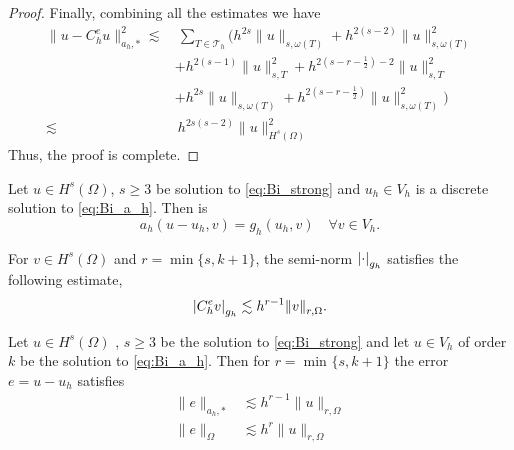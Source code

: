 \begin{proof}
    Finally, combining all the estimates we have
    \[
        \begin{split}
            \| u - C_{h}^{e}u \|_{ a_{h}, * }^{  2}  \lesssim  & \   \sum_{T \in \mathcal{T}_h}^{}  \bigg(    h^{2s}\| u \|_{s, \omega ( T)   }^{  } +  h^{2(s-2)} \| u \|_{ s, \omega ( T)  }^{ 2 } \\
             & +  h^{2(s-1)} \| u \|_{s,T }^{ 2} + h^{2(s- r- \frac{1}{2}) -2}   \| u \|_{s,T  }^{  2} \\
            & + h^{2s}  \| u \|_{s, \omega ( T)   }^{  } + h^{2(s-r -\frac{1}{2})}  \| u \|_{ s, \omega ( T)  }^{2  } \bigg) \\
            \lesssim & \ h^{2s ( s-2) } \| u \|_{H^{s}( \Omega )   }^{2  }
        \end{split}
    \]
    Thus, the proof is complete.
\end{proof}

\begin{lemma}
Let $u \in H^{s}( \Omega )  $, $ s\ge 3 $  be solution to \eqref{eq:Bi_strong} and $u_{h} \in V_{h}$ is a discrete solution to \eqref{eq:Bi_a_h}. Then is \[
    a_{h}( u - u_{h}, v) = g_{h} ( u_{h}, v) \quad \forall v \in V_{h}.
    \]
\end{lemma}

\begin{assumption}[EP2]
    \label{as:bi_EP2}
    For $v \in H^{s}( \Omega ) $ and $r = \min \{s,k+1 \} $, the semi-norm $\left\lvert  \cdot   \right\rvert_{g_{h}} $ satisfies the following estimate, \[
    \left\lvert  C _{h}^{e} v  \right\rvert _{g_{h}} \lesssim  h^{r-1} \| v \|_{ r,\Omega  }^{  }.
    \]
\end{assumption}


\begin{theorem}
    Let $u \in H^{s}( \Omega ) $ , $s\ge 3$ be the solution to \eqref{eq:Bi_strong} and let $u \in V_{h}$ of order $k$ be the solution to \eqref{eq:Bi_a_h}. Then for $r = \min_{}\{s, k+1\} $ the error $e = u - u_{h}$ satisfies
    \begin{align}
        \label{eq:bi_apriori_1}
            \| e \|_{ a_{h},* }^{  } &\lesssim   h^{r-1} \| u \|_{ r,\Omega  }^{  }\\
        \label{eq:bi_apriori_2}
            \| e \|_{ \Omega  }^{  } &\lesssim   h^{r} \| u \|_{ r,\Omega  }^{  }
    \end{align}

\end{theorem}

